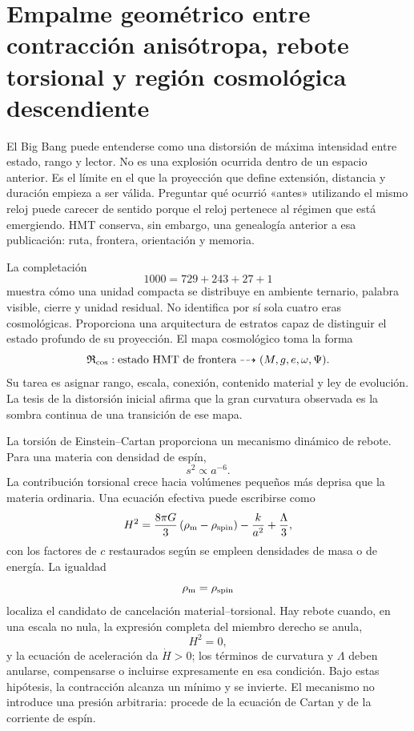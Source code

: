 \section{Empalme geométrico entre contracción anisótropa, rebote torsional y región cosmológica descendiente}

El Big Bang puede entenderse como una distorsión de máxima intensidad entre estado,
rango y lector. No es una explosión ocurrida dentro de un espacio anterior. Es el
límite en el que la proyección que define extensión, distancia y duración empieza a
ser válida. Preguntar qué ocurrió «antes» utilizando el mismo reloj puede carecer de
sentido porque el reloj pertenece al régimen que está emergiendo. HMT conserva, sin
embargo, una genealogía anterior a esa publicación: ruta, frontera, orientación y
memoria.

La completación
\[
 1000=729+243+27+1
\]
muestra cómo una unidad compacta se distribuye en ambiente ternario, palabra
visible, cierre y unidad residual. No identifica por sí sola cuatro eras
cosmológicas. Proporciona una arquitectura de estratos capaz de distinguir el
estado profundo de su proyección. El mapa cosmológico toma la forma
\[
 \mathfrak R_{\rm cos}:
 \text{estado HMT de frontera}
 \dashrightarrow
 (M,g,e,\omega,\Psi).
\]
Su tarea es asignar rango, escala, conexión, contenido material y ley de evolución.
La tesis de la distorsión inicial afirma que la gran curvatura observada es la sombra
continua de una transición de ese mapa.

La torsión de Einstein--Cartan proporciona un mecanismo dinámico de rebote. Para una
materia con densidad de espín,
\[
 s^2\propto a^{-6}.
\]
La contribución torsional crece hacia volúmenes pequeños más deprisa que la materia
ordinaria. Una ecuación efectiva puede escribirse como
\[
 H^2
 =
 \frac{8\pi G}{3}
 \left(\rho_{\rm m}-\rho_{\rm spin}\right)
 -
 \frac{k}{a^2}
 +
 \frac{\Lambda}{3},
\]
con los factores de \(c\) restaurados según se empleen densidades de masa o de
energía. La igualdad
\[
 \rho_{\rm m}=\rho_{\rm spin}
\]
localiza el candidato de cancelación material--torsional. Hay rebote cuando, en una
escala no nula, la expresión completa del miembro derecho se anula,
\[
 H^2=0,
\]
y la ecuación de aceleración da \(\dot H>0\); los términos de curvatura y
\(\Lambda\) deben anularse, compensarse o incluirse expresamente en esa condición.
Bajo estas hipótesis, la contracción alcanza un mínimo y se invierte. El mecanismo
no introduce una presión arbitraria: procede de la ecuación de Cartan y de la
corriente de espín.


